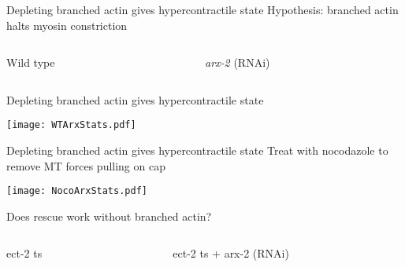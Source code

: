 \documentclass{beamer}
\newcommand{\6}[1]{#1_{\text{6}}}
\newcommand{\3}[1]{#1_{\text{3}}}
\begin{document}
\begin{frame}{Depleting branched actin gives hypercontractile state}
Hypothesis: branched actin halts myosin constriction

\begin{columns}
\begin{column}{0.5\textwidth}
\begin{center}
Wild type

\end{center}
\end{column}
\begin{column}{0.5\textwidth}
\begin{center}
\emph{arx-2} (RNAi)

\end{center}
\end{column}
\end{columns}

\end{frame}

\begin{frame}{Depleting branched actin gives hypercontractile state}

\begin{center}
\texttt{[image: WTArxStats.pdf]}
\end{center}

\end{frame}

\begin{frame}{Depleting branched actin gives hypercontractile state}
Treat with nocodazole to remove MT forces pulling on cap

\begin{center}
\texttt{[image: NocoArxStats.pdf]}
\end{center}

\end{frame}

\begin{frame}{Does rescue work without branched actin?}
\begin{columns}
\begin{column}{0.5\textwidth}
\begin{center}
ect-2 ts
\end{center}
\end{column}
\begin{column}{0.5\textwidth}
\begin{center}
\phantom{123} ect-2 ts + arx-2 (RNAi)
\end{center}
\end{column}
\end{columns}

\end{frame}
\end{document}
